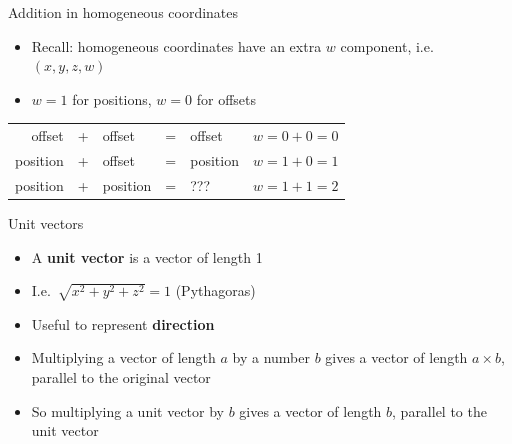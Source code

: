 \begin{frame}{Addition in homogeneous coordinates}
	\begin{itemize}
		\pause\item Recall: homogeneous coordinates have an extra $w$ component, i.e.\ $(x,y,z,w)$
		\pause\item $w=1$ for positions, $w=0$ for offsets
	\end{itemize}
	\begin{tabular}{rclclc}
		\pause offset & + & offset & = & offset & $w = 0 + 0 = 0$ \\
		\pause position & + & offset & = & position & $w = 1 + 0 = 1$ \\
		\pause position & + & position & = & ??? & $w = 1 + 1 = 2$
	\end{tabular}
\end{frame}

\begin{frame}{Unit vectors}
	\begin{itemize}
		\pause\item A \textbf{unit vector} is a vector of length 1
		\pause\item I.e.\ $\sqrt{x^2 + y^2 + z^2} = 1$ (Pythagoras)
		\pause\item Useful to represent \textbf{direction}
		\pause\item Multiplying a vector of length $a$ by a number $b$ gives a vector of length $a \times b$,
			parallel to the original vector
		\pause\item So multiplying a unit vector by $b$ gives a vector of length $b$,
			parallel to the unit vector		
	\end{itemize}
\end{frame}

